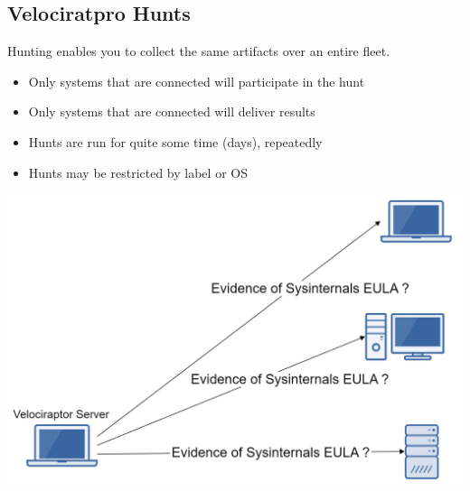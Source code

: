 \subsection{Velociratpro Hunts}
Hunting enables you to collect the same artifacts over an entire fleet.
\begin{itemize}
  \item Only systems that are connected will participate in the hunt
  \item Only systems that are connected will deliver results
  \item Hunts are run for quite some time (days), repeatedly
  \item Hunts may be restricted by label or OS
\end{itemize}

\includegraphics[width=\textwidth]{resources/06-velociraptor-hunt.png}

